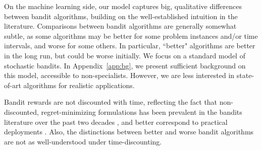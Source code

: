 On the machine learning side, our model captures big, qualitative differences between bandit algorithms, building on the well-established intuition in the literature. Comparisons between bandit algorithms are generally somewhat subtle, as some algorithms may be better for some problem instances and/or time intervals, and worse for some others. In particular, ``better" algorithms are better in the long run, but could be worse initially. We focus on a standard model of stochastic bandits. In Appendix~\ref{app:bg}, we present sufficient background on this model, accessible to non-specialists. However, we are less interested in state-of-art algorithms for realistic applications.

Bandit rewards are not discounted with time, reflecting the fact that non-discounted, regret-minimizing formulations has been prevalent in the bandits literature over the past two decades \citep{slivkins-MABbook,LS19bandit-book}, and better correspond to practical deployments \citep[\eg][]{DS-arxiv}. Also, the distinctions between better and worse bandit algorithms are not as well-understood under time-discounting.

